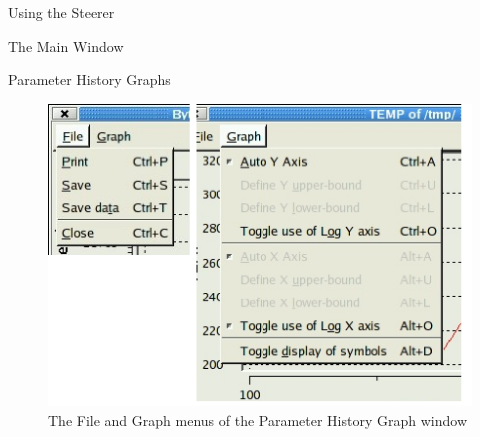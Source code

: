 \documentclass[a4paper,twoside]{article}
\begin{document}
\begin{section}{Using the Steerer}
\begin{subsection}{The Main Window}
\begin{subsubsection}{Parameter History Graphs}
\begin{figure}
\centerline{\includegraphics{hist_plot_menus.eps}}
\caption{The File and Graph menus of the Parameter History Graph window}
\label{fig:param_hist_menus}
\end{figure}


\end{subsubsection}
\end{subsection}
\end{section}
\end{document}
